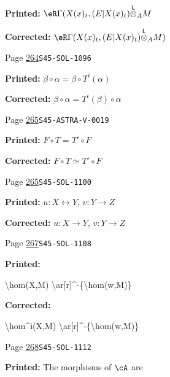 \documentclass[oneside]{book}
\newcommand{\lotimes}{{\overset{\mathsf{L}}{\otimes}}}
\theoremstyle{sga-source}
\theoremstyle{sga-source-dash}
\theoremstyle{sga-source-dotdash}
\theoremstyle{sga-source-number-note-dash}
\theoremstyle{sga-source-note-number-dotdash}
\theoremstyle{sga-source-example-dotdash}
\theoremstyle{sga-source-inline-number}
\theoremstyle{sga-source-bare-number}
\theoremstyle{sga-source}
\begin{document}
\begin{description}
\par\noindent\textbf{Printed:} \(\eR\Gamma(X(x)_t,(E|X(x)_t)\lotimes_A M\)
\par\noindent\textbf{Corrected:} \(\eR\Gamma(X(x)_t,(E|X(x)_t)\lotimes_A M)\)
\smallskip
\item[\hypertarget{apparatus:EN-0189}{189}] Page \hyperlink{printpage:en:264}{264}\quad\texttt{S45-SOL-1096}
\par\noindent\textbf{Printed:} \(\beta\circ \alpha = \beta\circ T^i(\alpha)\)
\par\noindent\textbf{Corrected:} \(\beta\circ \alpha = T^i(\beta)\circ\alpha\)
\smallskip
\item[\hypertarget{apparatus:EN-0190}{190}] Page \hyperlink{printpage:en:265}{265}\quad\texttt{S45-ASTRA-V-0019}
\par\noindent\textbf{Printed:} \(F\circ T = T'\circ F\)
\par\noindent\textbf{Corrected:} \(F\circ T \simeq T'\circ F\)
\smallskip
\item[\hypertarget{apparatus:EN-0191}{191}] Page \hyperlink{printpage:en:265}{265}\quad\texttt{S45-SOL-1100}
\par\noindent\textbf{Printed:} $u:X\leftrightarrow Y$, $v:Y\to Z$
\par\noindent\textbf{Corrected:} $u:X\to Y$, $v:Y\to Z$
\smallskip
\item[\hypertarget{apparatus:EN-0192}{192}] Page \hyperlink{printpage:en:267}{267}\quad\texttt{S45-SOL-1108}
\par\noindent\textbf{Printed:} {\footnotesize\ttfamily\raggedright \textbackslash{}\allowbreak{}hom(\allowbreak{}X,\allowbreak{}M)\allowbreak{} \textbackslash{}\allowbreak{}ar[\allowbreak{}r]\allowbreak{}\textasciicircum{}\allowbreak{}-\allowbreak{}\{\allowbreak{}\textbackslash{}\allowbreak{}hom(\allowbreak{}w,\allowbreak{}M)\allowbreak{}\}\allowbreak{}\par}
\par\noindent\textbf{Corrected:} {\footnotesize\ttfamily\raggedright \textbackslash{}\allowbreak{}hom\textasciicircum{}\allowbreak{}i(\allowbreak{}X,\allowbreak{}M)\allowbreak{} \textbackslash{}\allowbreak{}ar[\allowbreak{}r]\allowbreak{}\textasciicircum{}\allowbreak{}-\allowbreak{}\{\allowbreak{}\textbackslash{}\allowbreak{}hom(\allowbreak{}w,\allowbreak{}M)\allowbreak{}\}\allowbreak{}\par}
\smallskip
\item[\hypertarget{apparatus:EN-0193}{193}] Page \hyperlink{printpage:en:268}{268}\quad\texttt{S45-SOL-1112}
\par\noindent\textbf{Printed:} The morphisms of $\cA$ are

\end{description}
\end{document}

